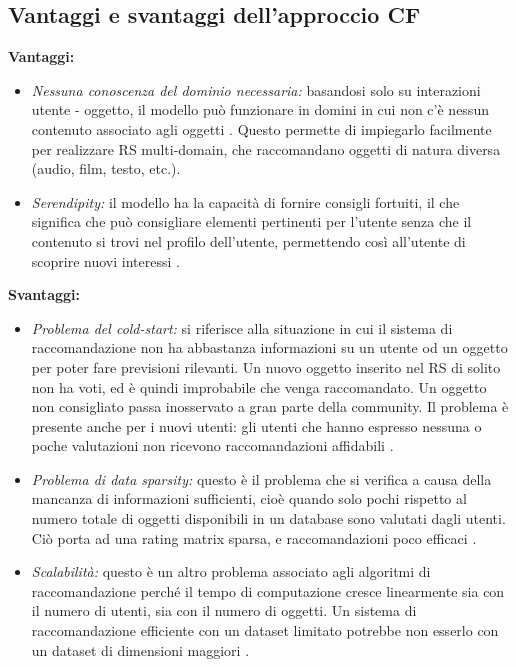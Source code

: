 \subsection{Vantaggi e svantaggi dell'approccio CF} \label{ssec:pros-cons-cf}
\textbf{Vantaggi:}
\begin{itemize}

 \item \textit{Nessuna conoscenza del dominio necessaria:} basandosi solo su interazioni utente - oggetto, il modello può funzionare in domini in cui non c'è nessun contenuto associato agli oggetti \cite{recsys-principle-methods-evaluation}. Questo permette di impiegarlo facilmente per realizzare RS multi-domain, che raccomandano oggetti di natura diversa (audio, film, testo, etc.).
 
 \item \textit{Serendipity:} il modello ha la capacità di fornire consigli fortuiti, il che significa che può consigliare elementi pertinenti per l'utente senza che il contenuto si trovi nel profilo dell'utente, permettendo così all'utente di scoprire nuovi interessi \cite{recsys-principle-methods-evaluation} \cite{cf-advantages-google}.
\end{itemize}

\noindent \textbf{Svantaggi:}
\begin{itemize}
 \item \textit{Problema del cold-start:} si riferisce alla situazione in cui il sistema di raccomandazione non ha abbastanza informazioni su un utente od un oggetto per poter fare previsioni rilevanti. Un nuovo oggetto inserito nel RS di solito non ha voti, ed è quindi improbabile che venga raccomandato. Un oggetto non consigliato passa inosservato a gran parte della community. Il problema è presente anche per i nuovi utenti: gli utenti che hanno espresso nessuna o poche valutazioni non ricevono raccomandazioni affidabili \cite{cold-start}.   
 
 \item  \textit{Problema di data sparsity:} questo è il problema che si verifica a causa della mancanza di informazioni sufficienti, cioè quando solo pochi rispetto al numero totale di oggetti disponibili in un database sono valutati dagli utenti. Ciò porta ad una rating matrix sparsa, e raccomandazioni poco efficaci \cite{recsys-principle-methods-evaluation}.
 
 \item \textit{Scalabilità:} questo è un altro problema associato agli algoritmi di raccomandazione perché il tempo di computazione cresce linearmente sia con il numero di utenti, sia con il numero di oggetti. Un sistema di raccomandazione efficiente con un dataset limitato potrebbe non esserlo con un dataset di dimensioni maggiori \cite{recsys-principle-methods-evaluation}.
\end{itemize}


